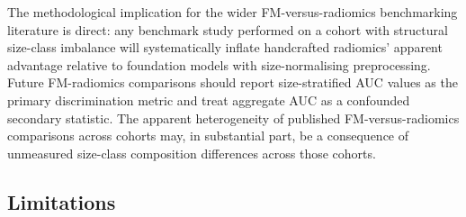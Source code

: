 The methodological implication for the wider FM-versus-radiomics benchmarking literature is direct: any benchmark study performed on a cohort with structural size-class imbalance will systematically inflate handcrafted radiomics' apparent advantage relative to foundation models with size-normalising preprocessing. Future FM-radiomics comparisons should report size-stratified AUC values as the primary discrimination metric and treat aggregate AUC as a confounded secondary statistic. The apparent heterogeneity of published FM-versus-radiomics comparisons across cohorts may, in substantial part, be a consequence of unmeasured size-class composition differences across those cohorts.

\subsection{Limitations}

